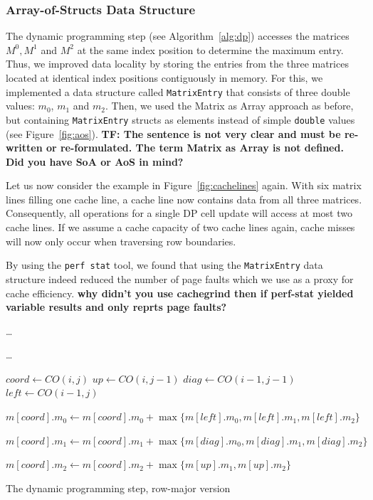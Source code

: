 \documentclass[runningheads,a4paper]{llncs}
\begin{document}
\subsubsection{Array-of-Structs Data Structure}
The dynamic programming step (see Algorithm~\ref{alg:dp}) accesses the matrices $M^0, M^1$ and $M^2$ at the same index position to determine the maximum entry.
Thus, we improved data locality by storing the entries from the three matrices located at identical index positions contiguously in memory.
For this, we implemented a data structure called \texttt{MatrixEntry} that consists of three double values: \texttt{$m_0$}, \texttt{$m_1$} and \texttt{$m_2$}.
Then, we used the Matrix as Array approach as before, but containing \texttt{MatrixEntry} structs as elements instead of simple
\texttt{double} values (see Figure~\ref{fig:aos}). \textbf{TF: The sentence is not very clear and must be re-written or re-formulated. The term Matrix as Array is not defined. Did you have SoA or AoS in mind?}

Let us now consider the example in Figure~\ref{fig:cachelines} again.
With six matrix lines filling one cache line, a cache line now contains data from all three matrices.
Consequently, all operations for a single DP cell update
will access at most two cache lines.
If we assume a cache capacity of two cache lines again, cache misses will now only occur when traversing row boundaries.

By using the \texttt{perf stat} tool, we found that using the \texttt{MatrixEntry} data structure indeed reduced
the number of page faults which we use as a proxy for cache efficiency.
{\bf why didn't you use cachegrind then if perf-stat yielded variable results and only reprts page faults?}


\begin{algorithm}

\ldots{}
 {
	 {
		\ldots{}

		$coord \gets CO(i, j)$\;
		$up \gets CO(i, j-1)$\;
		$diag \gets CO(i-1, j-1)$\;
		$left \gets CO(i-1, j)$\;

		$m[coord].m_0 \gets m[coord].m_0 + \max\{m[left].m_0, m[left].m_1, m[left].m_2\}$\;

		$m[coord].m_1 \gets m[coord].m_1 + \max\{m[diag].m_0, m[diag].m_1, m[diag].m_2\}$\;

		$m[coord].m_2 \gets m[coord].m_2 + \max\{m[up].m_1, m[up].m_2\}$\;
	}
}

\caption{The dynamic programming step, row-major version}
\label{alg:dp}
\end{algorithm}
\end{document}
